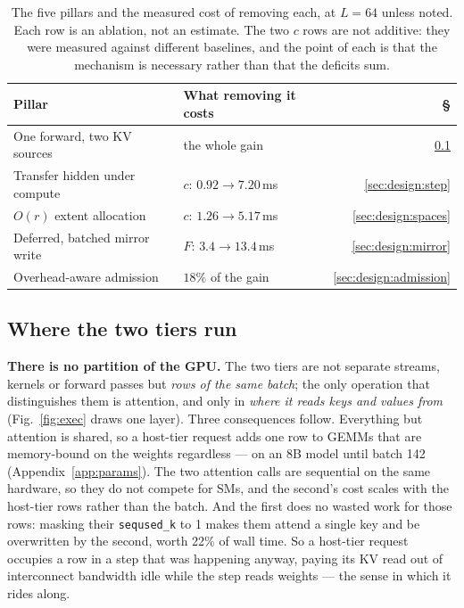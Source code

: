 \begin{table}[t]
\centering
\small
\begin{tabular}{llr}
\toprule
Pillar & What removing it costs & \S \\
\midrule
One forward, two KV sources & the whole gain & \ref{sec:design:exec} \\
Transfer hidden under compute & $c$: $0.92 \to 7.20$\,ms & \ref{sec:design:step} \\
$O(r)$ extent allocation & $c$: $1.26 \to 5.17$\,ms & \ref{sec:design:spaces} \\
Deferred, batched mirror write & $F$: $3.4 \to 13.4$\,ms & \ref{sec:design:mirror} \\
Overhead-aware admission & $18\%$ of the gain & \ref{sec:design:admission} \\
\bottomrule
\end{tabular}
\caption{The five pillars and the measured cost of removing each, at $L = 64$
unless noted. Each row is an ablation, not an estimate. The two $c$ rows are not
additive: they were measured against different baselines, and the point of each is
that the mechanism is necessary rather than that the deficits sum.}
\label{tab:pillars}
\end{table}

\subsection{Where the two tiers run}
\label{sec:design:exec}



\textbf{There is no partition of the GPU.} The two tiers are not separate streams,
kernels or forward passes but \emph{rows of the same batch}; the only operation that
distinguishes them is attention, and only in \emph{where it reads keys and values
from} (Fig.~\ref{fig:exec} draws one layer). Three consequences follow. Everything
but attention is shared, so a host-tier request adds one row to GEMMs that are
memory-bound on the weights regardless --- on an 8B model until batch 142
(Appendix~\ref{app:params}). The two attention calls are sequential on the same
hardware, so they do not compete for SMs, and the second's cost scales with the
host-tier rows rather than the batch. And the first does no wasted work for those
rows: masking their \texttt{seqused\_k} to 1 makes them attend a single key and be
overwritten by the second, worth 22\% of wall time. So a host-tier request occupies a
row in a step that was happening anyway, paying its KV read out of interconnect
bandwidth idle while the step reads weights --- the sense in which it rides along.


